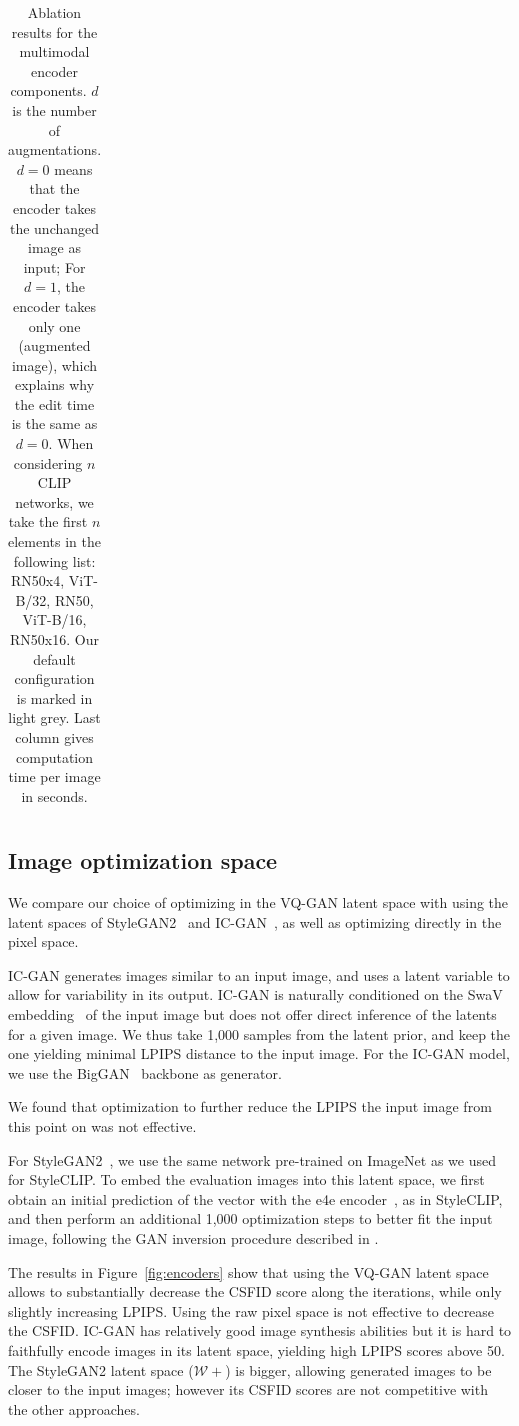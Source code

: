 \begin{table}[h!]
\begin{tabular}{lrrrrrr}
\end{tabular}

\caption{\label{table:runtime} Ablation results for the multimodal encoder components. $d$ is the number of augmentations. 
$d=0$ means that the encoder takes the unchanged image as input; For $d=1$, the encoder takes only one (augmented image), 
which explains why the edit time is the same as $d=0$.
When considering $n$ \ac{CLIP} networks, we take the first $n$ elements in the following list: RN50x4, ViT-B/32, RN50, 
ViT-B/16, RN50x16. 
Our default configuration  is marked in light grey. 
Last column gives computation time per image in seconds.
}

\end{table}


\subsection{Image optimization space} 
We compare our choice of optimizing in the VQ-GAN latent space with using the latent
 spaces of StyleGAN2~\cite{karra2020stylegan2} and IC-GAN~\citep{casanova21nips}, as well as 
 optimizing directly in the pixel space.


IC-GAN  generates images similar to an input image, 
and uses  a latent variable to allow for variability in its output. 
IC-GAN is naturally conditioned on the SwaV embedding~\cite{caron20nips} of the input image
but does not offer direct  inference of the latents  for a given image. We thus take 
1,000 samples from the latent prior, and keep the one yielding minimal \ac{LPIPS} distance 
to the input image. 
For the IC-GAN model, 
we use the BigGAN~\citep{brock2018large} 
backbone as generator.

We found that  optimization to further reduce the \ac{LPIPS}  \wrt the input image from this
 point on was not effective.

For StyleGAN2~\cite{karra2020stylegan2}, we use the same  network  pre-trained on ImageNet 
as we used for StyleCLIP.
To embed the evaluation images into this latent space, we first obtain an initial 
prediction of the vector with the e4e encoder~\cite{tov2021designing}, as in StyleCLIP, 
and then  perform an additional 1,000  optimization steps to better fit the input 
image, following the \ac{GAN} inversion procedure described in \cite{karra2019stylegan}.

The results in Figure~\ref{fig:encoders} show that using the VQ-GAN latent space allows 
to substantially decrease the  \ac{CSFID} score along the iterations, while only slightly 
increasing \ac{LPIPS}. 
Using the raw pixel space is not effective to decrease the \ac{CSFID}. 
IC-GAN has relatively good image synthesis abilities but it is hard to faithfully
 encode images in its latent space, yielding high \ac{LPIPS} scores above 50. 
The StyleGAN2 latent space ($\mathcal{W+}$) is bigger, allowing generated images to 
be closer to the input images; however its \ac{CSFID} scores are not competitive with the 
other approaches.

